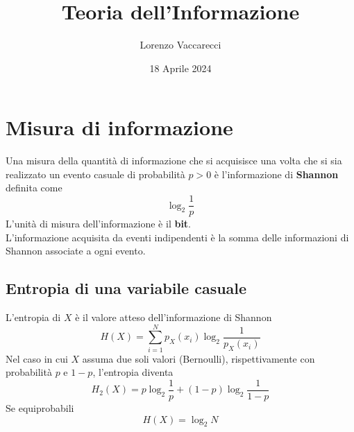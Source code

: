 \documentclass[12pt]{article}
\title{Teoria dell'Informazione}
\author{Lorenzo Vaccarecci}
\date{18 Aprile 2024}
\begin{document}
\maketitle
\section{Misura di informazione}
Una misura della quantità di informazione che si acquisisce una volta che si sia realizzato un evento casuale di probabilità $p>0$ è l'informazione di \textbf{Shannon} definita come
\begin{equation*}
    \log_{2}\frac{1}{p}
\end{equation*}
L'unità di misura dell'informazione è il \textbf{bit}.\\
L'informazione acquisita da eventi indipendenti è la somma delle informazioni di Shannon associate a ogni evento.
\subsection{Entropia di una variabile casuale}
L'entropia di $X$ è il valore atteso dell'informazione di Shannon
\begin{equation*}
    H(X)=\sum_{i=1}^{N} p_{X}(x_{i})\log_{2}\frac{1}{p_{X}(x_{i})}
\end{equation*}
Nel caso in cui $X$ assuma due soli valori (Bernoulli), rispettivamente con probabilità $p$ e $1-p$, l'entropia diventa
\begin{equation*}
    H_{2}(X)=p\log_{2}\frac{1}{p}+(1-p)\log_{2}\frac{1}{1-p}
\end{equation*}
Se equiprobabili
\begin{equation*}
    H(X)=\log_{2}N
\end{equation*}
\end{document}
